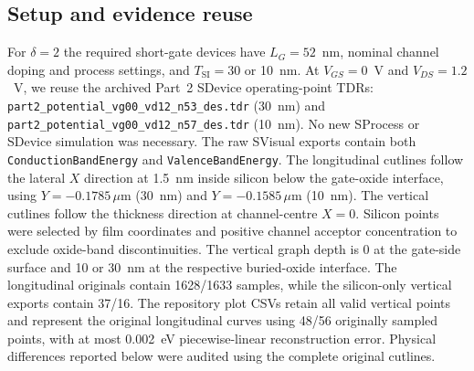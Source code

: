 \subsection{Setup and evidence reuse}
For $\delta=2$ the required short-gate devices have $L_G=52$~nm, nominal
channel doping and process settings, and $T_{\mathrm{SI}}=30$ or 10~nm.
At $V_{GS}=0$~V and $V_{DS}=1.2$~V, we reuse the archived Part~2
SDevice operating-point TDRs:
\texttt{part2\_potential\_vg00\_vd12\_n53\_des.tdr} (30~nm) and
\texttt{part2\_potential\_vg00\_vd12\_n57\_des.tdr} (10~nm).
No new SProcess or SDevice simulation was necessary.
The raw SVisual exports contain both
\texttt{ConductionBandEnergy} and \texttt{ValenceBandEnergy}.
The longitudinal cutlines follow the lateral $X$ direction
at 1.5~nm inside silicon below the gate-oxide interface,
using $Y=-0.1785\,\mu$m (30~nm) and
$Y=-0.1585\,\mu$m (10~nm).
The vertical cutlines follow the thickness direction at
channel-centre $X=0$. Silicon points were selected by film
coordinates and positive channel acceptor concentration
to exclude oxide-band discontinuities. The vertical graph
depth is 0 at the gate-side surface and 10 or 30~nm
at the respective buried-oxide interface.
The longitudinal originals contain 1628/1633 samples, while
the silicon-only vertical exports contain 37/16.
The repository plot CSVs retain all valid vertical points
and represent the original longitudinal curves using 48/56
originally sampled points, with at most 0.002~eV
piecewise-linear reconstruction error. Physical differences
reported below were audited using the complete original cutlines.



